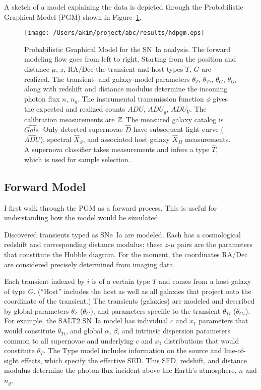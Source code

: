 \documentclass[preprint]{aastex}
\begin{document}
A sketch of a model explaining the data is depicted through the Probabilistic Graphical Model
(PGM)
shown in Figure~\ref{pgm:fig}.

\begin{figure}[htbp] %
   \centering
   \texttt{[image: /Users/akim/project/abc/results/hdpgm.eps]} 
   \caption{Probabilistic Graphical Model for the SN~Ia analysis.  The forward modeling
   flow goes from left to right.  Starting from the position and distance
   $\mu$, $z$, $\text{RA/Dec}$ the transient and host types $T$, $G$ are realized. 
   The transient- and
   galaxy-model parameters $\theta_T$, $\theta_{Ti}$, $\theta_G$, $\theta_{Gi}$ along
   with redshift and distance modulus determine the incoming photon flux $n$, $n_g$.
   The instrumental transmission function $\phi$ gives the expected and realized
   counts $\mathit{ADU}$, $\mathit{ADU}_g$, $\mathit{ADU}_V$.  The calibration measurements
   are $Z$.  The measured galaxy catalog is $\hat{\mathit{Gals.}}$  Only detected
   supernovae $\hat{D}$ have subsequent light curve ($\hat{ADU}$), spectral
   $\hat{X}_S$, and associated host galaxy $\hat{X}_H$ measurements.  A supernova
   classifier takes measurements and infers a type $\hat{T}$, which is used for sample selection.
   \label{pgm:fig}}
\end{figure}


\subsection{Forward Model}
I first walk through the PGM as a forward process.  This is useful for understanding
how the model would be simulated.

Discovered transients typed as SNe~Ia are modeled.  Each has
a cosmological redshift and corresponding distance modulus; these $z$-$\mu$ pairs are the  parameters that
constitute the Hubble diagram.  For the moment, the coordinates RA/Dec are considered
precisely determined from imaging data.

Each transient indexed by $i$ is of a certain type $T$ and comes from a  host galaxy of type $G$.  
(``Host'' includes the host as well as  all galaxies that project onto the coordinate of
the transient.)  The
transients (galaxies) are modeled and described by global parameters $\theta_T$ ($\theta_G$),
and  parameters specific to the transient $\theta_{Ti}$ ($\theta_{Gi}$).  For example, the SALT2 SN~Ia
model has individual $c$ and $x_1$ parameters that would constitute $\theta_{Ti}$,
and global $\alpha$, $\beta$, and intrinsic dispersion  parameters  common to all supernovae
 and  underlying  $c$ and $x_1$ distributions that would constitute $\theta_T$.
The Type model includes  information on the
source and line-of-sight effects, which specify the effective SED. 
This SED, redshift, and  distance modulus determine the photon flux incident above the Earth's
atmosphere, $n$ and $n_g$.  
\end{document}
